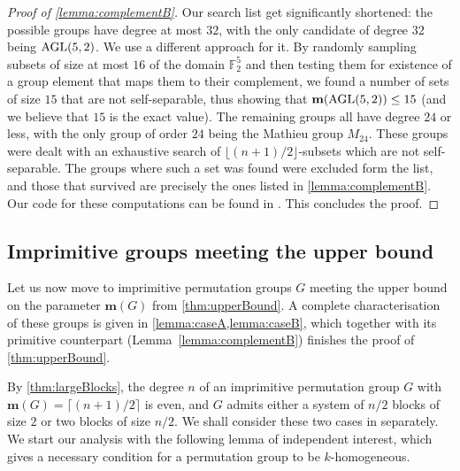 \documentclass[a4paper]{amsart}
\newcommand{\FF}{\mathbb{F}}
\newcommand{\m}{\mathbf{m}}
\theoremstyle{definition}
\begin{document}
\begin{proof}[Proof of \cref{lemma:complementB}]
Our search list get significantly shortened: the possible groups have degree at most $32$, with the only candidate of degree $32$ being ${\rm AGL}(5,2)$. We use a different approach for it. By randomly sampling subsets of size at most $16$ of the domain $\FF_2^5$ and then testing them for existence of a group element that maps them to their complement, we found a number of sets of size $15$ that are not self-separable, thus showing that $\m({\rm AGL}(5,2)) \le 15$ (and we believe that $15$ is the exact value). The remaining groups all have degree $24$ or less, with the only group of order $24$ being the Mathieu group $M_{24}$. These groups were dealt with an exhaustive search of $\lfloor(n+1)/2\rfloor$-subsets which are not self-separable. The groups where such a set was found were excluded form the list, and those that survived are precisely the ones listed in \cref{lemma:complementB}.
Our code for these computations can be found in \cite{ourAlgorithm}. This concludes the proof.
\end{proof}


\subsection{Imprimitive groups meeting the upper bound} 
\label{sub:upperImprimitive}

Let us now move to imprimitive permutation groups $G$ meeting the upper bound on the parameter $\m(G)$ from \cref{thm:upperBound}.
A complete characterisation of
these groups is given in \cref{lemma:caseA,lemma:caseB},
which together with
its primitive counterpart (Lemma~\ref{lemma:complementB}) finishes the proof of \cref{thm:upperBound}.

By \cref{thm:largeBlocks}, the degree $n$ of an imprimitive permutation group $G$ with $\m(G) = \lceil  (n+1)/2 \rceil$
is even, and $G$ admits either a system of $n/2$ blocks of size $2$ or two blocks of size $n/2$. We shall consider these two
cases in separately.
We start our analysis with the following lemma of independent interest, which gives a necessary condition for a permutation group to be $k$-homogeneous.
\end{document}
